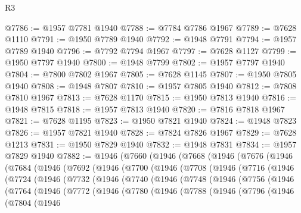 \begin{lexlean}{R3}
\begin{coremodule}
@7786 := @1957 @7781 @1940
@7788 := @7784 @7786 @1967
@7789 := @7628 @1110
@7791 := @1950 @7789 @1940
@7792 := @1948 @7791
@7794 := @1957 @7789 @1940
@7796 := @7792 @7794 @1967
@7797 := @7628 @1127
@7799 := @1950 @7797 @1940
@7800 := @1948 @7799
@7802 := @1957 @7797 @1940
@7804 := @7800 @7802 @1967
@7805 := @7628 @1145
@7807 := @1950 @7805 @1940
@7808 := @1948 @7807
@7810 := @1957 @7805 @1940
@7812 := @7808 @7810 @1967
@7813 := @7628 @1170
@7815 := @1950 @7813 @1940
@7816 := @1948 @7815
@7818 := @1957 @7813 @1940
@7820 := @7816 @7818 @1967
@7821 := @7628 @1195
@7823 := @1950 @7821 @1940
@7824 := @1948 @7823
@7826 := @1957 @7821 @1940
@7828 := @7824 @7826 @1967
@7829 := @7628 @1213
@7831 := @1950 @7829 @1940
@7832 := @1948 @7831
@7834 := @1957 @7829 @1940
@7882 := @1946
    (@7660
      (@1946
        (@7668
          (@1946
            (@7676
              (@1946
                (@7684
                  (@1946
                    (@7692
                      (@1946
                        (@7700
                          (@1946
                            (@7708
                              (@1946
                                (@7716
                                  (@1946
                                    (@7724
                                      (@1946
                                        (@7732
                                          (@1946
                                            (@7740
                                              (@1946
                                                (@7748
                                                  (@1946
                                                    (@7756
                                                      (@1946
                                                        (@7764
                                                          (@1946
                                                            (@7772
                                                              (@1946
                                                                (@7780
                                                                  (@1946
                                                                    (@7788
                                                                      (@1946
                                                                        (@7796
                                                                          (@1946
                                                                            (@7804
                                                                              (@1946

\end{coremodule}
\end{lexlean}
